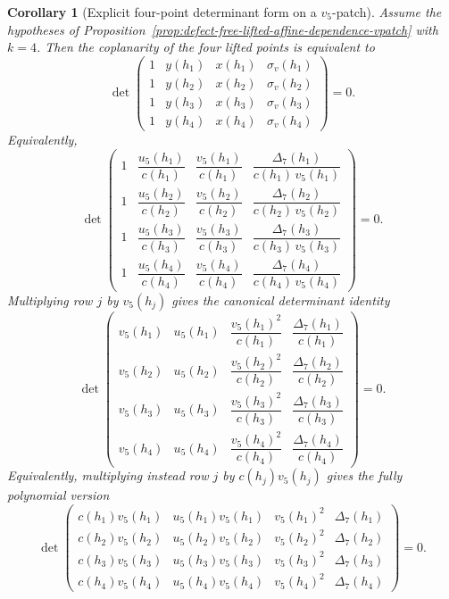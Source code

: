 \documentclass[11pt,a4paper]{amsart}
\theoremstyle{plain}
\newtheorem{corollary}[theorem]{Corollary}
\theoremstyle{definition}
\begin{document}
\begin{corollary}[Explicit four-point determinant form on a $v_5$-patch]
\label{cor:explicit-four-point-determinant-form-vpatch}
Assume the hypotheses of
Proposition~\ref{prop:defect-free-lifted-affine-dependence-vpatch} with
$k=4$. Then the coplanarity of the four lifted points is equivalent to
\[
\det\!\begin{pmatrix}
1 & y(h_1) & x(h_1) & \sigma_v(h_1)\\
1 & y(h_2) & x(h_2) & \sigma_v(h_2)\\
1 & y(h_3) & x(h_3) & \sigma_v(h_3)\\
1 & y(h_4) & x(h_4) & \sigma_v(h_4)
\end{pmatrix}
=0.
\]
Equivalently,
\[
\det\!\begin{pmatrix}
1 & \dfrac{u_5(h_1)}{c(h_1)} & \dfrac{v_5(h_1)}{c(h_1)} &
\dfrac{\Delta_7(h_1)}{c(h_1)\,v_5(h_1)}\\[1.2ex]
1 & \dfrac{u_5(h_2)}{c(h_2)} & \dfrac{v_5(h_2)}{c(h_2)} &
\dfrac{\Delta_7(h_2)}{c(h_2)\,v_5(h_2)}\\[1.2ex]
1 & \dfrac{u_5(h_3)}{c(h_3)} & \dfrac{v_5(h_3)}{c(h_3)} &
\dfrac{\Delta_7(h_3)}{c(h_3)\,v_5(h_3)}\\[1.2ex]
1 & \dfrac{u_5(h_4)}{c(h_4)} & \dfrac{v_5(h_4)}{c(h_4)} &
\dfrac{\Delta_7(h_4)}{c(h_4)\,v_5(h_4)}
\end{pmatrix}
=0.
\]
Multiplying row $j$ by $v_5(h_j)$ gives the canonical determinant identity
\[
\det\!\begin{pmatrix}
v_5(h_1) & u_5(h_1) & \dfrac{v_5(h_1)^2}{c(h_1)} &
\dfrac{\Delta_7(h_1)}{c(h_1)}\\[1.2ex]
v_5(h_2) & u_5(h_2) & \dfrac{v_5(h_2)^2}{c(h_2)} &
\dfrac{\Delta_7(h_2)}{c(h_2)}\\[1.2ex]
v_5(h_3) & u_5(h_3) & \dfrac{v_5(h_3)^2}{c(h_3)} &
\dfrac{\Delta_7(h_3)}{c(h_3)}\\[1.2ex]
v_5(h_4) & u_5(h_4) & \dfrac{v_5(h_4)^2}{c(h_4)} &
\dfrac{\Delta_7(h_4)}{c(h_4)}
\end{pmatrix}
=0.
\]
Equivalently, multiplying instead row $j$ by $c(h_j)v_5(h_j)$ gives the
fully polynomial version
\[
\det\!\begin{pmatrix}
c(h_1)v_5(h_1) & u_5(h_1)v_5(h_1) & v_5(h_1)^2 & \Delta_7(h_1)\\
c(h_2)v_5(h_2) & u_5(h_2)v_5(h_2) & v_5(h_2)^2 & \Delta_7(h_2)\\
c(h_3)v_5(h_3) & u_5(h_3)v_5(h_3) & v_5(h_3)^2 & \Delta_7(h_3)\\
c(h_4)v_5(h_4) & u_5(h_4)v_5(h_4) & v_5(h_4)^2 & \Delta_7(h_4)
\end{pmatrix}
=0.
\]
\end{corollary}
\end{document}
